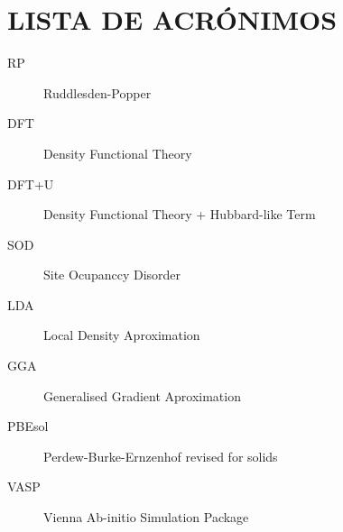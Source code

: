 \chapter*{LISTA DE ACRÓNIMOS}

\begin{description}
  \item[RP] Ruddlesden-Popper
  \item[DFT] Density Functional Theory
  \item[DFT+U] Density Functional Theory + Hubbard-like Term
  \item[SOD] Site Ocupanccy Disorder
  \item[LDA] Local Density Aproximation
  \item[GGA] Generalised Gradient Aproximation
  \item[PBEsol] Perdew-Burke-Ernzenhof revised for solids
  \item[VASP] Vienna Ab-initio Simulation Package
\end{description}

